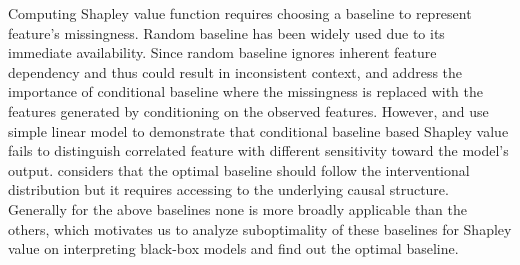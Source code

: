 Computing Shapley value function requires choosing a baseline to represent feature’s missingness. Random baseline \cite{lundberg2017unified,chen2018shapley, kwon2022weightedshap} has been widely used due to its immediate availability. Since random baseline ignores inherent feature dependency and thus could result in inconsistent context, \citet{frye2020shapley} and \citet{hooker2021unrestricted} address the importance of conditional baseline where the missingness is replaced with the features generated by conditioning on the observed features. However, \citet{janzing2020feature} and \citet{kumar2020problems} use simple linear model to demonstrate that conditional baseline based Shapley value fails to distinguish correlated feature with different sensitivity toward the model’s output. \citet{watson2022rational} considers that the optimal baseline should follow the interventional distribution but it requires accessing to the underlying causal structure. Generally for the above baselines none is more broadly applicable than the others, which motivates us to analyze suboptimality of these baselines for Shapley value on interpreting black-box models and find out the optimal baseline.